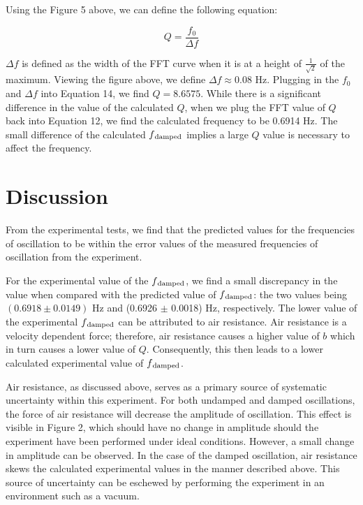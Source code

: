 \documentclass[twoside,twocolumn]{article}
\begin{document}
\noindent Using the Figure 5 above, we can define the following equation:

\footnotesize
\begin{equation}
Q = \frac{f_0}{\Delta f}
\end{equation}
\normalsize

\noindent $\Delta f$ is defined as the width of the FFT curve when it is at a height of $\frac{1}{\sqrt{2}}$ of the maximum. Viewing the figure above, we define $\Delta f \approx 0.08$ Hz. Plugging in the $f_0$ and $\Delta f$ into Equation 14, we find $ Q= 8.6575$. While there is a significant difference in the value of the calculated $Q$, when we plug the FFT value of $Q$ back into Equation 12, we find the calculated frequency to be 0.6914 Hz. The small difference of the calculated $f\textsubscript{damped}$ implies a large $Q$ value is necessary to affect the frequency.


\section{Discussion}
\noindent From the experimental tests, we find that the predicted values for the frequencies of oscillation to be within the error values of the measured frequencies of oscillation from the experiment. 

\hfill

\noindent For the experimental value of the $f\textsubscript{damped}$, we find a small discrepancy in the value when compared with the predicted value of $f\textsubscript{damped}$: the two values being $(0.6918 \pm 0.0149)$ Hz and (0.6926 $\pm$ 0.0018) Hz, respectively.  The lower value of the experimental $f\textsubscript{damped}$ can be attributed to air resistance. Air resistance is a velocity dependent force; therefore, air resistance causes a higher value of $b$ which in turn causes a lower value of $Q$. Consequently, this then leads to a lower calculated experimental value of $f\textsubscript{damped}$.

\hfill

\noindent Air resistance, as discussed above, serves as a primary source of systematic uncertainty within this experiment. For both undamped and damped oscillations, the force of air resistance will decrease the amplitude of oscillation. This effect is visible in Figure 2, which should have no change in amplitude should the experiment have been performed under ideal conditions. However, a small change in amplitude can be observed. In the case of the damped oscillation, air resistance skews the calculated experimental values in the manner described above. This source of uncertainty can be eschewed by performing the experiment in an environment such as a vacuum.
\end{document}
